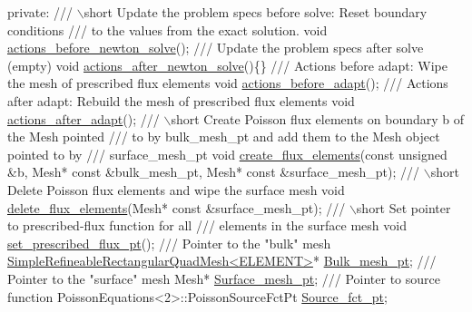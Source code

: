 \begin{DoxyCodeInclude}
\textcolor{keyword}{private}:
\textcolor{comment}{}
\textcolor{comment}{ /// \(\backslash\)short Update the problem specs before solve: Reset boundary conditions}
\textcolor{comment}{ /// to the values from the exact solution.}
\textcolor{comment}{} \textcolor{keywordtype}{void} \hyperlink{classRefineableTwoMeshFluxPoissonProblem_a209506229c491a8cec4e1dce387e18c3}{actions\_before\_newton\_solve}();
\textcolor{comment}{}
\textcolor{comment}{ /// Update the problem specs after solve (empty)}
\textcolor{comment}{} \textcolor{keywordtype}{void} \hyperlink{classRefineableTwoMeshFluxPoissonProblem_ab8b04db3dab6297f609a9a028b1c4473}{actions\_after\_newton\_solve}()\{\}
\textcolor{comment}{}
\textcolor{comment}{ /// Actions before adapt: Wipe the mesh of prescribed flux elements}
\textcolor{comment}{} \textcolor{keywordtype}{void} \hyperlink{classRefineableTwoMeshFluxPoissonProblem_a10d2a67a5ac599161ddcf876b31334f6}{actions\_before\_adapt}();
\textcolor{comment}{}
\textcolor{comment}{ /// Actions after adapt: Rebuild the mesh of prescribed flux elements}
\textcolor{comment}{} \textcolor{keywordtype}{void} \hyperlink{classRefineableTwoMeshFluxPoissonProblem_a0140155529861f5e63ab32feece3c9b6}{actions\_after\_adapt}();
\textcolor{comment}{}
\textcolor{comment}{ /// \(\backslash\)short Create Poisson flux elements on boundary b of the Mesh pointed}
\textcolor{comment}{ /// to by bulk\_mesh\_pt and add them to the Mesh object pointed to by }
\textcolor{comment}{ /// surface\_mesh\_pt}
\textcolor{comment}{} \textcolor{keywordtype}{void} \hyperlink{classRefineableTwoMeshFluxPoissonProblem_ac2eaf11cfc4dda41f97cacc2a1a1f86e}{create\_flux\_elements}(\textcolor{keyword}{const} \textcolor{keywordtype}{unsigned} &b, Mesh* \textcolor{keyword}{const} &bulk\_mesh\_pt,
                           Mesh* \textcolor{keyword}{const} &surface\_mesh\_pt);
\textcolor{comment}{}
\textcolor{comment}{ /// \(\backslash\)short Delete Poisson flux elements and wipe the surface mesh}
\textcolor{comment}{} \textcolor{keywordtype}{void} \hyperlink{classRefineableTwoMeshFluxPoissonProblem_ab35087cadc6dbc7a602441b9a986d650}{delete\_flux\_elements}(Mesh* \textcolor{keyword}{const} &surface\_mesh\_pt);
\textcolor{comment}{}
\textcolor{comment}{ /// \(\backslash\)short Set pointer to prescribed-flux function for all}
\textcolor{comment}{ /// elements in the surface mesh}
\textcolor{comment}{} \textcolor{keywordtype}{void} \hyperlink{classRefineableTwoMeshFluxPoissonProblem_aa0aeec40bbdb0649e309e51ad96e5da7}{set\_prescribed\_flux\_pt}();
\textcolor{comment}{}
\textcolor{comment}{ /// Pointer to the "bulk" mesh}
\textcolor{comment}{} \hyperlink{classSimpleRefineableRectangularQuadMesh}{SimpleRefineableRectangularQuadMesh<ELEMENT>}* 
      \hyperlink{classRefineableTwoMeshFluxPoissonProblem_a35746600caac7fd5b1a2ccec6beff8d6}{Bulk\_mesh\_pt};
\textcolor{comment}{}
\textcolor{comment}{ /// Pointer to the "surface" mesh}
\textcolor{comment}{} Mesh* \hyperlink{classRefineableTwoMeshFluxPoissonProblem_a1ad7c5a406b267f2d79c52b3d347971d}{Surface\_mesh\_pt};
\textcolor{comment}{}
\textcolor{comment}{ /// Pointer to source function}
\textcolor{comment}{} PoissonEquations<2>::PoissonSourceFctPt \hyperlink{classRefineableTwoMeshFluxPoissonProblem_a0f3434b437ca4b5e6a97ecae9e826477}{Source\_fct\_pt};


\end{DoxyCodeInclude}
